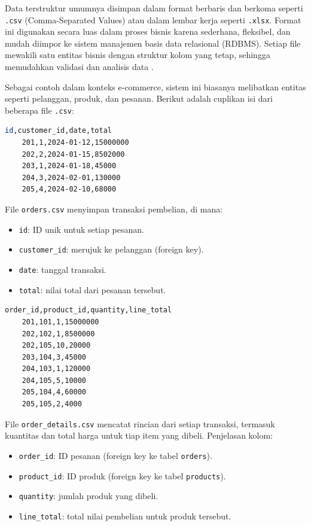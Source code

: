Data terstruktur umumnya disimpan dalam format berbaris dan berkoma seperti \texttt{.csv} (Comma-Separated Values) atau dalam lembar kerja seperti \texttt{.xlsx}. Format ini digunakan secara luas dalam proses bisnis karena sederhana, fleksibel, dan mudah diimpor ke sistem manajemen basis data relasional (RDBMS). Setiap file mewakili satu entitas bisnis dengan struktur kolom yang tetap, sehingga memudahkan validasi dan analisis data \cite{elmasri2016}.

Sebagai contoh dalam konteks e-commerce, sistem ini biasanya melibatkan entitas seperti pelanggan, produk, dan pesanan. Berikut adalah cuplikan isi dari beberapa file \texttt{.csv}:

\begin{lstlisting}[language=bash, caption={Contoh isi file \texttt{orders.csv}}, label={lst:orders_csv}]
	id,customer_id,date,total
	201,1,2024-01-12,15000000
	202,2,2024-01-15,8502000
	203,1,2024-01-18,45000
	204,3,2024-02-01,130000
	205,4,2024-02-10,68000
\end{lstlisting}

File \texttt{orders.csv} menyimpan transaksi pembelian, di mana:
\begin{itemize}
	\item \texttt{id}: ID unik untuk setiap pesanan.
	\item \texttt{customer\_id}: merujuk ke pelanggan (foreign key).
	\item \texttt{date}: tanggal transaksi.
	\item \texttt{total}: nilai total dari pesanan tersebut.
\end{itemize}

\begin{lstlisting}[language=bash, caption={Contoh isi file \texttt{order\_details.csv}}, label={lst:order_details_csv}]
	order_id,product_id,quantity,line_total
	201,101,1,15000000
	202,102,1,8500000
	202,105,10,20000
	203,104,3,45000
	204,103,1,120000
	204,105,5,10000
	205,104,4,60000
	205,105,2,4000
\end{lstlisting}

File \texttt{order\_details.csv} mencatat rincian dari setiap transaksi, termasuk kuantitas dan total harga untuk tiap item yang dibeli. Penjelasan kolom:

\begin{itemize}
	\item \texttt{order\_id}: ID pesanan (foreign key ke tabel \texttt{orders}).
	\item \texttt{product\_id}: ID produk (foreign key ke tabel \texttt{products}).
	\item \texttt{quantity}: jumlah produk yang dibeli.
	\item \texttt{line\_total}: total nilai pembelian untuk produk tersebut.
\end{itemize}

